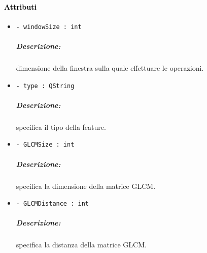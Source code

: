 \paragraph{\textcolor{black}{Attributi\\}}
	\begin{itemize}
		\item \color{teal}\verb!- windowSize : int!
		\color{black}
		\subparagraph{Descrizione:} dimensione della finestra sulla quale effettuare le operazioni.
		\item \color{teal}\verb!- type : QString!
		\color{black}
		\subparagraph{Descrizione:} specifica il tipo della feature\g{}.
		\item \color{teal}\verb!- GLCMSize : int!
		\color{black}
		\subparagraph{Descrizione:} specifica la dimensione della matrice GLCM.
		\item \color{teal}\verb!- GLCMDistance : int!
		\color{black}
		\subparagraph{Descrizione:} specifica la distanza della matrice GLCM.
	\end{itemize}

